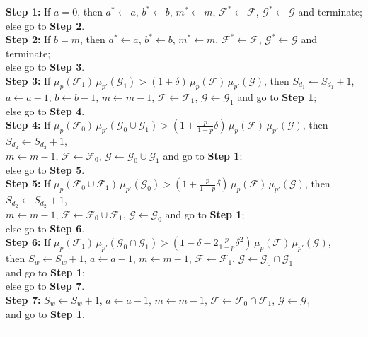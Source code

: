 \documentclass[10pt]{amsart}
\theoremstyle{remark}
\newcommand{\Fcal}{\mathcal{F}}
\newcommand{\Gcal}{\mathcal{G}}
\begin{document}
\begin{algorithm}
\textbf{Step 1:} If $a=0$, then $a^*\leftarrow a$, $b^*\leftarrow b$, $m^*\leftarrow m$,
$\Fcal^*\leftarrow\Fcal$, $\Gcal^*\leftarrow\Gcal$ and terminate; \\
\hspace{1.3cm} else go to \textbf{Step 2}.\\
\textbf{Step 2:} If $b=m$, then $a^*\leftarrow a$, $b^*\leftarrow b$, $m^*\leftarrow m$,
$\Fcal^*\!\leftarrow\Fcal$, $\Gcal^*\leftarrow\Gcal$ and terminate; \\
\hspace{1.3cm} else go to \textbf{Step 3}.\\
\textbf{Step 3:} If $\mu_p(\Fcal_1)\, \mu_{p'}(\Gcal_1)> (1+\delta)\,\mu_p(\Fcal)\, \mu_{p'}(\Gcal)$,
then $S_{d_1}\leftarrow S_{d_1}+1$, \\
\hspace{1.6cm} $a\leftarrow a-1$, $b\leftarrow b-1$, $m\leftarrow m-1$,
$\Fcal\leftarrow\Fcal_1$, $\Gcal\leftarrow\Gcal_1$ and go to \textbf{Step 1}; \\
\hspace{1.3cm} else go to \textbf{Step 4}.  \\
\textbf{Step 4:} If $\mu_p(\Fcal_0)\, \mu_{p'}(\Gcal_0\cup\Gcal_1)>(1+\frac{p}{1-p}\delta)\,
\mu_p(\Fcal)\, \mu_{p'}(\Gcal)$, then $S_{d_2}\leftarrow S_{d_2}+1$, \\
\hspace{1.6cm} $m\leftarrow m-1$, $\Fcal\leftarrow\Fcal_0$, $\Gcal\leftarrow\Gcal_0\cup\Gcal_1$
and go to \textbf{Step 1}; \\
\hspace{1.3cm} else go to \textbf{Step 5}. \\
\textbf{Step 5:} If $\mu_{p}(\Fcal_0\cup\Fcal_1)\, \mu_{p'}(\Gcal_0)>(1+\frac{p}{1-p}\delta)\,
\mu_p(\Fcal)\, \mu_{p'}(\Gcal)$, then $S_{d_2}\leftarrow S_{d_2}+1$, \\
\hspace{1.6cm} $m\leftarrow m-1$, $\Fcal\leftarrow\Fcal_0\cup \Fcal_1$, $\Gcal\leftarrow\Gcal_0$
and go to \textbf{Step 1}; \\
\hspace{1.3cm} else go to \textbf{Step 6}. \\
\textbf{Step 6:} If $\mu_p(\Fcal_1)\, \mu_{p'}(\Gcal_0\cap\Gcal_1)> (1-\delta-2\frac{p}{1-p}\delta^2)\,
\mu_p(\Fcal)\,\mu_{p'}(\Gcal)$, \\
\hspace{1.6cm} then $S_{w}\leftarrow S_{w}+1$, $a\leftarrow a-1$, $m\leftarrow m-1$, $\Fcal\leftarrow\Fcal_1$,
$\Gcal\leftarrow\Gcal_0\cap\Gcal_1$ \\
\hspace{1.6cm} and go to \textbf{Step 1}; \\
\hspace{1.3cm} else go to \textbf{Step 7}. \\
\textbf{Step 7:} $S_{w}\leftarrow S_{w}+1$, $a\leftarrow a-1$, $m\leftarrow m-1$,
$\Fcal\leftarrow\Fcal_0\cap\Fcal_1$, $\Gcal\leftarrow\Gcal_1$ \\
\hspace{1.6cm} and go to \textbf{Step 1}.
\vspace{0.1cm}
\hrule
\end{algorithm}
\end{document}
